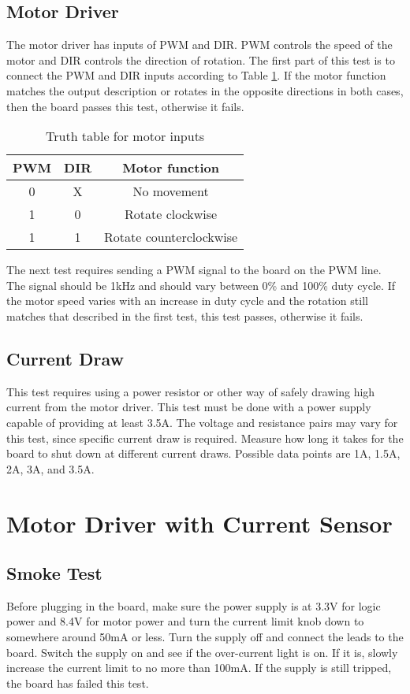 \documentclass[12pt,letterpaper]{article}
\begin{document}
	\subsection{Motor Driver}
	The motor driver has inputs of PWM and DIR. PWM controls the speed of the motor and DIR controls the direction of rotation. The first part of this test is to connect the PWM and DIR inputs according to Table \ref{tbl:motor_driver_truth_table}. If the motor function matches the output description or rotates in the opposite directions in both cases, then the board passes this test, otherwise it fails.
	\begin{table}[H]
		\centering
		\label{tbl:motor_driver_truth_table}
		\caption{Truth table for motor inputs}
		\begin{tabular}{| c | c | c |}
			\hline
			PWM & DIR & Motor function \\
			\hline
			0 & X & No movement \\
			1 & 0 & Rotate clockwise \\ 
			1 & 1 & Rotate counterclockwise \\
			\hline
		\end{tabular}
	\end{table}
	The next test requires sending a PWM signal to the board on the PWM line. The signal should be 1kHz and should vary between 0\% and 100\% duty cycle. If the motor speed varies with an increase in duty cycle and the rotation still matches that described in the first test, this test passes, otherwise it fails.
	
	\subsection{Current Draw}
	This test requires using a power resistor or other way of safely drawing high current from the motor driver. This test must be done with a power supply capable of providing at least 3.5A. The voltage and resistance pairs may vary for this test, since specific current draw is required. Measure how long it takes for the board to shut down at different current draws. Possible data points are 1A, 1.5A, 2A, 3A, and 3.5A. %
	
	\newpage
	\section{Motor Driver with Current Sensor}
	\subsection{Smoke Test}
	Before plugging in the board, make sure the power supply is at 3.3V for logic power and 8.4V for motor power and turn the current limit knob down to somewhere around 50mA or less. Turn the supply off and connect the leads to the board. Switch the supply on and see if the over-current light is on. If it is, slowly increase the current limit to no more than 100mA. If the supply is still tripped, the board has failed this test.
	
\end{document}
